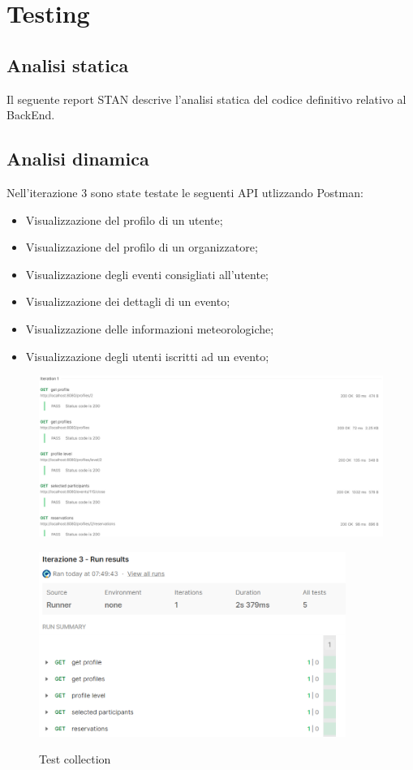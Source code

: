 \section{Testing}
\subsection{Analisi statica}
Il seguente report STAN descrive l'analisi statica del codice definitivo relativo al BackEnd.
\\


\subsection{Analisi dinamica}
Nell’iterazione 3 sono state testate le seguenti API utlizzando Postman:

\begin{itemize}
	\item Visualizzazione del profilo di un utente;
	\item Visualizzazione del profilo di un organizzatore;
	\item Visualizzazione degli eventi consigliati all'utente;
  \item Visualizzazione dei dettagli di un evento;
  \item Visualizzazione delle informazioni meteorologiche;
  \item Visualizzazione degli utenti iscritti ad un evento;
\end{itemize}

\begin{figure}[h!]
\begin{center}
  \includegraphics[width=14cm]{Iterazione 3/images/it3_api.PNG}\\
  \caption{Test collection}
  \includegraphics[width=10cm]{Iterazione 3/images/it3.png}\\
\end{center}
\end{figure}
